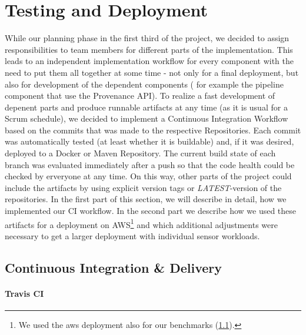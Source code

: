 \section{Testing and Deployment}
While our planning phase in the first third of the project, we decided to assign responsibilities to team members for different parts of the implementation.
This leads to an independent implementation workflow for every component with the need to put them all together at some time - not only for a final deployment, but also for development of the dependent components ( for example the pipeline component that use the Provenance API).
To realize a fast development of depenent parts and produce runnable artifacts at any time (as it is usual for a Scrum schedule), we decided to implement a Continuous Integration Workflow based on the commits that was made to the respective Repositories. Each commit was automatically tested (at least whether it is buildable) and, if it was desired, deployed to a Docker or Maven Repository. The current build state of each branch was evaluated immediately after a push so that the code health could be checked by erveryone at any time.
On this way, other parts of the project could include the artifacts by using explicit version tags or \emph{LATEST}-version of the repositories. In the first part of this section, we will describe in detail, how we implemented our CI workflow. In the second part we describe how we used these artifacts for a deployment on AWS\footnote{We used the aws deployment also for our benchmarks (\ref{}).} and which additional adjustments were necessary to get a larger deployment with individual sensor workloads.

\subsection{Continuous Integration \& Delivery}

\paragraph*{Travis CI}
%

